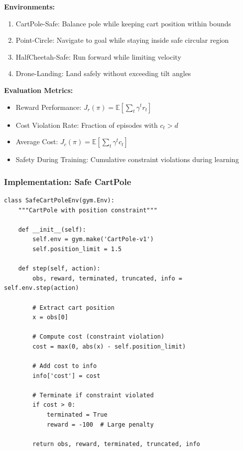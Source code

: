 \documentclass[12pt]{article}
\begin{document}
{{{{\textbf{Environments:}
\begin{enumerate}
\item CartPole-Safe: Balance pole while keeping cart position within bounds
\item Point-Circle: Navigate to goal while staying inside safe circular region
\item HalfCheetah-Safe: Run forward while limiting velocity
\item Drone-Landing: Land safely without exceeding tilt angles
\end{enumerate}

\textbf{Evaluation Metrics:}
\begin{itemize}
\item Reward Performance: $J_r(\pi) = \mathbb{E}[\sum_t \gamma^t r_t]$
\item Cost Violation Rate: Fraction of episodes with $c_t > d$
\item Average Cost: $J_c(\pi) = \mathbb{E}[\sum_t \gamma^t c_t]$
\item Safety During Training: Cumulative constraint violations during learning
\end{itemize}

\subsubsection{Implementation: Safe CartPole}

\begin{verbatim}
class SafeCartPoleEnv(gym.Env):
    """CartPole with position constraint"""
    
    def __init__(self):
        self.env = gym.make('CartPole-v1')
        self.position_limit = 1.5
    
    def step(self, action):
        obs, reward, terminated, truncated, info = self.env.step(action)
        
        # Extract cart position
        x = obs[0]
        
        # Compute cost (constraint violation)
        cost = max(0, abs(x) - self.position_limit)
        
        # Add cost to info
        info['cost'] = cost
        
        # Terminate if constraint violated
        if cost > 0:
            terminated = True
            reward = -100  # Large penalty
        
        return obs, reward, terminated, truncated, info
\end{verbatim}

}}}}
\end{document}
